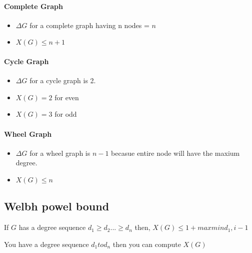 \paragraph{Complete Graph}\begin{itemize}
    \item $\Delta G$ for a complete graph having n nodes = $n$
    \item $X(G) \leq n + 1$
\end{itemize}

\paragraph{Cycle Graph}\begin{itemize}
    \item $\Delta G$ for a cycle graph is 2.
    \item $X(G) = 2$ for even
    \item $X(G) = 3$ for odd
\end{itemize}

\paragraph{Wheel Graph}\begin{itemize}
    \item $\Delta G$ for a wheel graph is $n-1$ becasue entire node will have the maxium degree.
    \item $X(G) \leq n$
\end{itemize}

\subsection{Welbh powel bound}
If $G$ has a degree sequence $d_1 \geq d_2 ... \geq d_n$ then, $X(G) \leq 1 + max min{d_1, i-1}$

You have a degree sequence $d_1 to d_n$ then you can compute $X(G)$